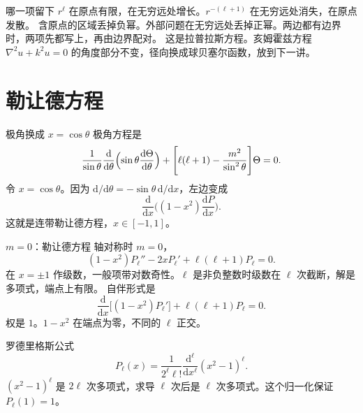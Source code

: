 \documentclass[fontset=windows, chinese, 10pt, xcolor=dvipsnames]{beamer}
\begin{document}
\begin{frame}{哪一项留下}
  $r^{\ell}$ 在原点有限，在无穷远处增长。$r^{-(\ell+1)}$ 在无穷远处消失，在原点发散。
  \vspace{0.4em}
  含原点的区域丢掉负幂。外部问题在无穷远处丢掉正幂。两边都有边界时，两项先都写上，再由边界配对。
  \vspace{0.35em}
  这是拉普拉斯方程。亥姆霍兹方程 $\nabla^2 u+k^2 u=0$ 的角度部分不变，径向换成球贝塞尔函数，放到下一讲。
\end{frame}

\section{勒让德方程}

\begin{frame}{极角换成 $x=\cos\theta$}
  极角方程是
  \[
    \frac{1}{\sin\theta}\frac{\mathrm{d}}{\mathrm{d}\theta}
      \Bigl(\sin\theta\frac{\mathrm{d}\Theta}{\mathrm{d}\theta}\Bigr)
    +\Biggl[\ell(\ell+1)-\frac{m^2}{\sin^2\theta}\Biggr]\Theta=0.
  \]
  令 $x=\cos\theta$。因为 $\mathrm{d}/\mathrm{d}\theta=-\sin\theta\,\mathrm{d}/\mathrm{d}x$，左边变成
  \[
    \frac{\mathrm{d}}{\mathrm{d}x}\Biggl((1-x^2)\frac{\mathrm{d}P}{\mathrm{d}x}\Biggr).
  \]
  这就是连带勒让德方程，$x\in[-1,1]$。
\end{frame}

\begin{frame}{$m=0$：勒让德方程}
  轴对称时 $m=0$，
  \begin{equation*}
    (1-x^2)P_{\ell}''-2x P_{\ell}'+\ell(\ell+1)P_{\ell}=0.
  \end{equation*}
  在 $x=\pm 1$ 作级数，一般项带对数奇性。$\ell$ 是非负整数时级数在 $\ell$ 次截断，解是多项式，端点上有限。
  \vspace{0.35em}
  自伴形式是
  \[
    \frac{\mathrm{d}}{\mathrm{d}x}\bigl[(1-x^2)P_{\ell}'\bigr]+\ell(\ell+1)P_{\ell}=0.
  \]
  权是 $1$。$1-x^2$ 在端点为零，不同的 $\ell$ 正交。
\end{frame}

\begin{frame}{罗德里格斯公式}
  \begin{equation*}
    \boxed{\displaystyle
      P_{\ell}(x)
      =\frac{1}{2^{\ell}\ell!}
        \frac{\mathrm{d}^{\ell}}{\mathrm{d}x^{\ell}}(x^2-1)^{\ell}.}
  \end{equation*}
  $(x^2-1)^{\ell}$ 是 $2\ell$ 次多项式，求导 $\ell$ 次后是 $\ell$ 次多项式。这个归一化保证 $P_{\ell}(1)=1$。
\end{frame}
\end{document}
